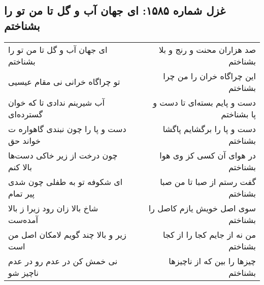 \begin{center}
\section*{غزل شماره ۱۵۸۵: ای جهان آب و گل تا من تو را بشناختم}
\label{sec:1585}
\begin{longtable}{l p{0.5cm} r}
ای جهان آب و گل تا من تو را بشناختم
&&
صد هزاران محنت و رنج و بلا بشناختم
\\
تو چراگاه خرانی نی مقام عیسیی
&&
این چراگاه خران را من چرا بشناختم
\\
آب شیرینم ندادی تا که خوان گسترده‌ای
&&
دست و پایم بسته‌ای تا دست و پا بشناختم
\\
دست و پا را چون نبندی گاهواره ت خواند حق
&&
دست و پا را برگشایم پاگشا بشناختم
\\
چون درخت از زیر خاکی دست‌ها بالا کنم
&&
در هوای آن کسی کز وی هوا بشناختم
\\
ای شکوفه تو به طفلی چون شدی پیر تمام
&&
گفت رستم از صبا تا من صبا بشناختم
\\
شاخ بالا زان رود زیرا ز بالا آمده‌ست
&&
سوی اصل خویش یازم کاصل را بشناختم
\\
زیر و بالا چند گویم لامکان اصل من است
&&
من نه از جایم کجا را از کجا بشناختم
\\
نی خمش کن در عدم رو در عدم ناچیز شو
&&
چیزها را بین که از ناچیزها بشناختم
\\
\end{longtable}
\end{center}
